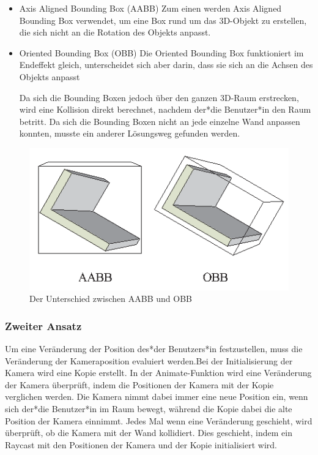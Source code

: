 \begin{itemize}
    \item Axis Aligned Bounding Box (AABB)
    \newline
    Zum einen werden Axis Aligned Bounding Box verwendet, um eine Box rund um das 3D-Objekt zu erstellen, die sich nicht an die Rotation des Objekts anpasst.
    \item Oriented Bounding Box (OBB)
    \newline
    Die Oriented Bounding Box funktioniert im Endeffekt gleich, unterscheidet sich aber darin, dass sie sich an die Achsen des Objekts anpasst
    
    Da sich die Bounding Boxen jedoch über den ganzen 3D-Raum erstrecken, wird eine Kollision direkt berechnet, nachdem der*die Benutzer*in den Raum betritt. Da sich die Bounding Boxen nicht an jede einzelne Wand anpassen konnten, musste ein anderer Lösungsweg gefunden werden.
\end{itemize}
\begin{figure}
    \centering
    \includegraphics[scale=0.65]{pics/aabb_obb.png}
    \caption{Der Unterschied zwischen AABB und OBB \cite{AABBandOBBPicture}}
    \label{fig:impl:aabb_obb}
\end{figure}


\subsubsection{Zweiter Ansatz}
Um eine Veränderung der Position des*der Benutzers*in festzustellen, muss die Veränderung der Kameraposition evaluiert werden.Bei der Initialisierung der Kamera wird eine Kopie erstellt. In der Animate-Funktion wird eine Veränderung der Kamera überprüft, indem die Positionen der Kamera mit der Kopie verglichen werden. Die Kamera nimmt dabei immer eine neue Position ein, wenn sich der*die Benutzer*in im Raum bewegt, während die Kopie dabei die alte Position der Kamera einnimmt. Jedes Mal wenn eine Veränderung geschieht, wird überprüft, ob die Kamera mit der Wand kollidiert. Dies geschieht, indem ein Raycast mit den Positionen der Kamera und der Kopie initialisiert wird. 
     
